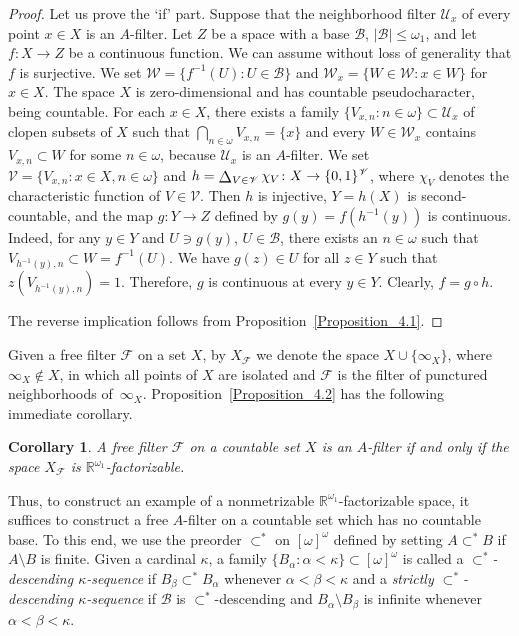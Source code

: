 \documentclass[a4paper,12pt]{amsart}
\newtheorem{corollary}{Corollary}[section]
\theoremstyle{definition}
\theoremstyle{remark}
\def\bigdiag{\operatornamewithlimits{%
  \mathchoice{\vcenter{\hbox{\Large$\Delta$}}}
             {\vcenter{\hbox{\large$\Delta$}}}
             {\Delta}
             {\Delta}}}
\begin{document}
\begin{proof}
Let us prove the `if' part. Suppose that the neighborhood filter $\mathscr U_x$ of every
point $x\in X$ is an $A$-filter. 
Let $Z$ be a space with a base $\mathscr{B}$, $|\mathscr{B}|\leq\omega_1$, and let $f\colon X\to Z$ be a
continuous function. We can assume without loss of generality that $f$ is surjective. 
We set $\mathscr{W}=\{ f^{-1}(U): U\in \mathscr{B}\}$ and 
$\mathscr{W}_x=\{W\in \mathscr{W}: x\in W\}$ for $x\in X$.
The space $X$ is zero-dimensional and has countable pseudocharacter, being countable.
For each $x\in X$, there exists a family $\{V_{x,n}:n\in\omega\}\subset \mathscr U_x$ of clopen subsets of $X$ 
such that $\bigcap_{n\in \omega}V_{x,n}=\{x\}$ and every $W\in \mathscr{W}_x$ contains $V_{x,n}\subset W$ 
for some $n\in\omega$, because $\mathscr U_x$ is an $A$-filter. 
We set $\mathscr{V}=\{V_{x,n}: x\in X, n\in\omega\}$ and 
$h=\bigdiag_{V\in \mathscr{V}} \chi_V\colon X\to \{0,1\}^{\mathscr{V}}$, where $\chi_V$ denotes 
the characteristic function 
of $V\in \mathscr{V}$. 
Then $h$ is injective, $Y=h(X)$ is second-countable, and the map  
$g\colon Y\to Z$ defined by $g(y)=f(h^{-1}(y))$ is continuous. Indeed, for any $y\in Y$ and $U\ni g(y)$, 
$U\in \mathscr B$, there exists an $n\in \omega$ such that $V_{h^{-1}(y),n}\subset W=f^{-1}(U)$. 
We have $g(z)\in U$ for all $z\in Y$ such that $z(V_{h^{-1}(y),n})=1$. Therefore, $g$ is continuous at 
every $y\in Y$. Clearly, $f=g\circ h$.

The reverse implication follows from Proposition~\ref{Proposition_4.1}.
\end{proof}


Given a free filter $\mathscr F$ on a set $X$, by $X_{\mathscr F}$ we denote the space $X\cup\{\infty_X\}$, where 
$\infty_X\notin X$, in which all points of $X$ are isolated and $\mathscr F$ is the filter of punctured 
neighborhoods of~$\infty_X$. Proposition~\ref{Proposition_4.2} has the following immediate corollary. 

\begin{corollary}
\label{Corollary_4.1}
 A free filter $\mathscr F$  on a countable set $X$ is an $A$-filter if and only if 
the space $X_{\mathscr F}$ is $\mathbb 
R^{\omega_1}$-factorizable.
\end{corollary}

Thus, to construct an example of a nonmetrizable $\mathbb R^{\omega_1}$-factorizable space, it suffices to 
construct a free $A$-filter on a countable set which has no countable base. To this end, we use the preorder 
$\subset^*$ on $[\omega]^\omega$ defined by setting $A\subset^* B$ if $A\setminus B$ is finite. Given a cardinal 
$\kappa$, a family $\{B_\alpha: \alpha<\kappa\} \subset [\omega]^\omega$ is called a \emph{$\subset^*$-descending 
$\kappa$-sequence} if $B_\beta\subset^* B_\alpha$ whenever $\alpha<\beta<\kappa$ and a \emph{strictly 
$\subset^*$-descending $\kappa$-sequence} if $\mathscr B$ is $\subset^*$-descending and $B_\alpha\setminus 
B_\beta$ is infinite whenever $\alpha<\beta<\kappa$. 
\end{document}
